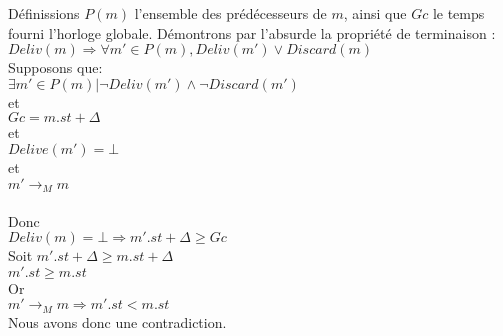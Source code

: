Définissions $P(m)$ l'ensemble des prédécesseurs de $m$, ainsi que $Gc$ le temps fourni l'horloge globale. Démontrons par l'absurde la propriété de terminaison : \hfill \\
\hspace{2cm}$Deliv(m) \Rightarrow \forall  m' \in P(m), Deliv(m')  \vee Discard(m)$ \\ 
Supposons que: \\
$\exists m' \in P(m) | \neg Deliv(m') \wedge \neg Discard(m') $\\
et \\
  $Gc= m.st + \Delta$\\
et\\
$Delive(m') = \bot$\\ 
et\\
$m' \rightarrow _M m$\\\\
Donc\\
$Deliv(m) = \bot \Rightarrow m'.st+ \Delta \geq Gc$\\
Soit $m'.st+\Delta \geq m.st+\Delta$\\
$m'.st \geq m.st $\\
Or\\
$m' \rightarrow _M m \Rightarrow m'.st < m.st $ \\
Nous avons donc une contradiction.




